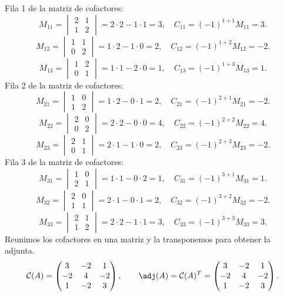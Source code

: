 Fila 1 de la matriz de cofactores:
\[
M_{11}=\begin{vmatrix}2&1\\1&2\end{vmatrix}=2\cdot 2-1\cdot 1=3,\quad C_{11}=(-1)^{1+1}M_{11}=3.
\]
\[
M_{12}=\begin{vmatrix}1&1\\0&2\end{vmatrix}=1\cdot 2-1\cdot 0=2,\quad C_{12}=(-1)^{1+2}M_{12}=-2.
\]
\[
M_{13}=\begin{vmatrix}1&2\\0&1\end{vmatrix}=1\cdot 1-2\cdot 0=1,\quad C_{13}=(-1)^{1+3}M_{13}=1.
\]
Fila 2 de la matriz de cofactores:
\[
M_{21}=\begin{vmatrix}1&0\\1&2\end{vmatrix}=1\cdot 2-0\cdot 1=2,\quad C_{21}=(-1)^{2+1}M_{21}=-2.
\]
\[
M_{22}=\begin{vmatrix}2&0\\0&2\end{vmatrix}=2\cdot 2-0\cdot 0=4,\quad C_{22}=(-1)^{2+2}M_{22}=4.
\]
\[
M_{23}=\begin{vmatrix}2&1\\0&1\end{vmatrix}=2\cdot 1-1\cdot 0=2,\quad C_{23}=(-1)^{2+3}M_{23}=-2.
\]
Fila 3 de la matriz de cofactores:
\[
M_{31}=\begin{vmatrix}1&0\\2&1\end{vmatrix}=1\cdot 1-0\cdot 2=1,\quad C_{31}=(-1)^{3+1}M_{31}=1.
\]
\[
M_{32}=\begin{vmatrix}2&0\\1&1\end{vmatrix}=2\cdot 1-0\cdot 1=2,\quad C_{32}=(-1)^{3+2}M_{32}=-2.
\]
\[
M_{33}=\begin{vmatrix}2&1\\1&2\end{vmatrix}=2\cdot 2-1\cdot 1=3,\quad C_{33}=(-1)^{3+3}M_{33}=3.
\]
Reunimos los cofactores en una matriz y la transponemos para obtener la adjunta.
\[
\mathcal{C}(A)=\begin{pmatrix}3&-2&1\\-2&4&-2\\1&-2&3\end{pmatrix},\qquad\adj(A)=\mathcal{C}(A)^T=\begin{pmatrix}3&-2&1\\-2&4&-2\\1&-2&3\end{pmatrix}.
\]
